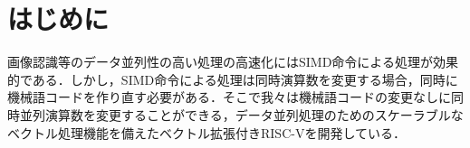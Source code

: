 \documentclass[a4paper,9pt, twocolumn]{jarticle}
\begin{document}








\section{はじめに}
画像認識等のデータ並列性の高い処理の高速化にはSIMD命令による処理が効果的である．しかし，SIMD命令による処理は同時演算数を変更する場合，同時に機械語コードを作り直す必要がある．そこで我々は機械語コードの変更なしに同時並列演算数を変更することができる，データ並列処理のためのスケーラブルなベクトル処理機能を備えたベクトル拡張付きRISC-Vを開発している\cite{bib:kimura}．
\end{document}
